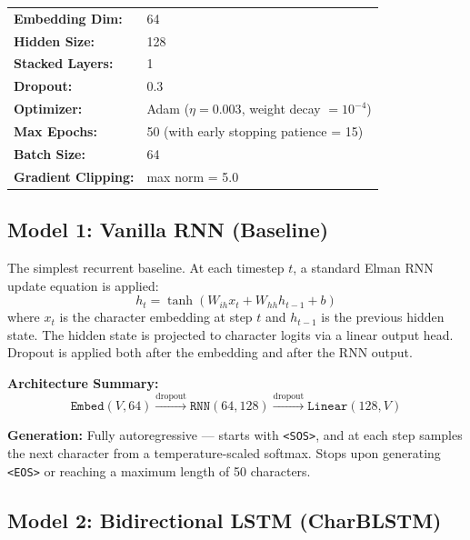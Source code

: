\documentclass[11pt,a4paper]{article}
\begin{document}
\begin{infoBox}
\begin{center}
\renewcommand{\arraystretch}{1.2}
\begin{tabular}{ll}
    \textbf{Embedding Dim:} & 64 \\
    \textbf{Hidden Size:}   & 128 \\
    \textbf{Stacked Layers:} & 1 \\
    \textbf{Dropout:}        & 0.3 \\
    \textbf{Optimizer:}      & Adam ($\eta = 0.003$, weight decay $= 10^{-4}$) \\
    \textbf{Max Epochs:}     & 50 (with early stopping patience = 15) \\
    \textbf{Batch Size:}     & 64 \\
    \textbf{Gradient Clipping:} & max norm = 5.0 \\
\end{tabular}
\end{center}
\end{infoBox}

\vspace{0.5em}

\subsection{Model 1: Vanilla RNN (Baseline)}
The simplest recurrent baseline. At each timestep $t$, a standard Elman RNN update equation is applied:
\[ h_t = \tanh(W_{ih} x_t + W_{hh} h_{t-1} + b) \]
where $x_t$ is the character embedding at step $t$ and $h_{t-1}$ is the previous hidden state. The hidden state is projected to character logits via a linear output head. Dropout is applied both after the embedding and after the RNN output.

\textbf{Architecture Summary:}
\[
\texttt{Embed}(V, 64) \xrightarrow{\text{dropout}} \texttt{RNN}(64, 128) \xrightarrow{\text{dropout}} \texttt{Linear}(128, V)
\]

\textbf{Generation:} Fully autoregressive — starts with \texttt{<SOS>}, and at each step samples the next character from a temperature-scaled softmax. Stops upon generating \texttt{<EOS>} or reaching a maximum length of 50 characters.

\subsection{Model 2: Bidirectional LSTM (CharBLSTM)}
\end{document}
